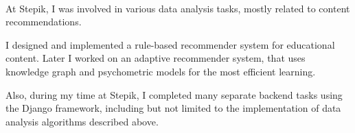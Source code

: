\documentclass[letterpaper]{deedy-resume} %
\begin{document}
\begin{minipage}[t][0.75\textheight][t]{0.6\textwidth}
\sectionspace

\\
\sectionspace

\begin{tightitemize}
\item At Stepik, I was involved in various data analysis tasks, mostly related to content recommendations. 
\item I designed and implemented a rule-based recommender system for educational content. Later I worked on an adaptive recommender system, that uses knowledge graph and psychometric models for the most efficient learning. 
\item Also, during my time at Stepik, I completed many separate backend tasks using the Django framework, including but not limited to the implementation of data analysis algorithms described above.
\end{tightitemize}

\sectionspace


\end{minipage} %








\end{document}

